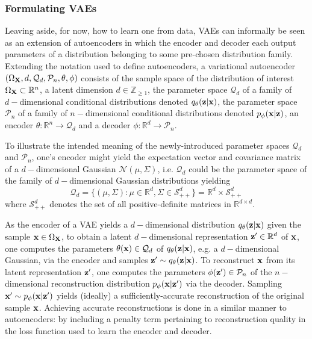 \documentclass[11pt]{article}
\begin{document}
\subsubsection{Formulating VAEs}
Leaving aside, for now, how to learn one from data, VAEs can informally be seen as an extension of autoencoders in which the encoder and decoder each output parameters of a distribution belonging to some pre-chosen distribution family. Extending the notation used to define autoencoders, a variational autoencoder $(\Omega_{\mathbf{X}},d,\mathcal{Q}_d,\mathcal{P}_n,\theta,\phi)$ consists of the sample space of the distribution of interest $\Omega_{\mathbf{X}}\subset\mathbb{R}^n$, a latent dimension $d\in\mathbb{Z}_{\geq1}$, the parameter space $\mathcal{Q}_d$ of a family of $d-$dimensional conditional distributions denoted $q_{\theta}(\mathbf{z}|\mathbf{x})$, the parameter space $\mathcal{P}_n$ of a family of $n-$dimensional conditional distributions denoted $p_{\phi}(\mathbf{x}|\mathbf{z})$, an encoder $\theta:\mathbb{R}^n\to\mathcal{Q}_d$ and a decoder $\phi:\mathbb{R}^d\to\mathcal{P}_n$.

To illustrate the intended meaning of the newly-introduced parameter spaces $\mathcal{Q}_d$ and $\mathcal{P}_n$, one's encoder might yield the expectation vector and covariance matrix of a $d-$dimensional Gaussian $\mathcal{N}(\mu,\Sigma)$, i.e. $\mathcal{Q}_d$ could be the parameter space of the family of $d-$dimensional Gaussian distributions yielding
$$
\mathcal{Q}_d
=
\{
(\mu,\Sigma):\mu\in\mathbb{R}^d, \Sigma\in\mathcal{S}_{++}^d
\}
=
\mathbb{R}^d\times\mathcal{S}_{++}^d
$$
where $\mathcal{S}_{++}^d$ denotes the set of all positive-definite matrices in $\mathbb{R}^{d\times d}$.

As the encoder of a VAE yields a $d-$dimensional distribution $q_{\theta}(\mathbf{z}|\mathbf{x})$ given the sample $\mathbf{x}\in\Omega_{\mathbf{X}}$, to obtain a latent $d-$dimensional representation $\mathbf{z}'\in\mathbb{R}^d$ of $\mathbf{x}$, one computes the parameters $\theta(\mathbf{x})\in\mathcal{Q}_d$ of $q_{\theta}(\mathbf{z}|\mathbf{x})$, e.g. a $d-$dimensional Gaussian, via the encoder and samples $\mathbf{z}'\sim q_{\theta}(\mathbf{z}|\mathbf{x})$. To reconstruct $\mathbf{x}$ from its latent representation $\mathbf{z}'$, one computes the parameters $\phi(\mathbf{z}')\in\mathcal{P}_n$ of the $n-$dimensional reconstruction distribution $p_{\phi}(\mathbf{x}|\mathbf{z}')$ via the decoder. Sampling $\mathbf{x}'\sim p_{\phi}(\mathbf{x}|\mathbf{z}')$ yields (ideally) a sufficiently-accurate reconstruction of the original sample $\mathbf{x}$. Achieving accurate reconstructions is done in a similar manner to autoencoders: by including a penalty term pertaining to reconstruction quality in the loss function used to learn the encoder and decoder.
\end{document}
